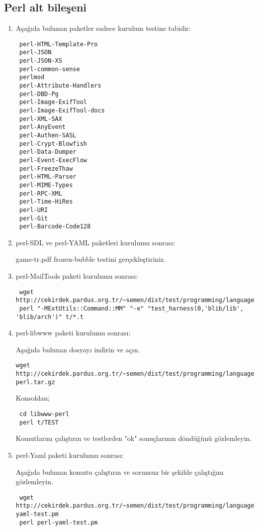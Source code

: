 \documentclass[a4paper,10pt]{article}
\begin{document}
\subsection{Perl alt bileşeni}
\begin{enumerate}
\item Aşağıda bulunan paketler sadece kurulum testine tabidir:
\begin{verbatim}
 perl-HTML-Template-Pro
 perl-JSON
 perl-JSON-XS
 perl-common-sense
 perlmod
 perl-Attribute-Handlers
 perl-DBD-Pg
 perl-Image-ExifTool
 perl-Image-ExifTool-docs
 perl-XML-SAX
 perl-AnyEvent
 perl-Authen-SASL
 perl-Crypt-Blowfish
 perl-Data-Dumper
 perl-Event-ExecFlow
 perl-FreezeThaw
 perl-HTML-Parser
 perl-MIME-Types
 perl-RPC-XML
 perl-Time-HiRes
 perl-URI
 perl-Git
 perl-Barcode-Code128
\end{verbatim}

\item perl-SDL ve perl-YAML paketleri kurulumu sonrası:

game-tr.pdf frozen-bubble testini gerçekleştiriniz.

\item perl-MailTools paketi kurulumu sonrası:
\begin{verbatim}
 wget http://cekirdek.pardus.org.tr/~semen/dist/test/programming/language/perl/MailTools.tar.gz
 perl "-MExtUtils::Command::MM" "-e" "test_harness(0,'blib/lib', 'blib/arch')" t/*.t
\end{verbatim}

\item perl-libwww paketi kurulumu sonrası:

Aşağıda bulunan dosyayı indirin ve açın.
\begin{verbatim}
wget http://cekirdek.pardus.org.tr/~semen/dist/test/programming/language/perl/libwww-perl.tar.gz
\end{verbatim}

Konsoldan;
\begin{verbatim}
 cd libwww-perl
 perl t/TEST
\end{verbatim}

Komutlarını çalıştırın ve testlerden "ok" sonuçlarının döndüğünü gözlemleyin.

\item perl-Yaml paketi kurulumu sonrası:

Aşağıda bulunan komutu çalıştırın ve sorunsuz bir şekilde çalıştığını gözlemleyin.
\begin{verbatim}
 wget http://cekirdek.pardus.org.tr/~semen/dist/test/programming/language/perl/perl-yaml-test.pm
 perl perl-yaml-test.pm
\end{verbatim}


\end{enumerate}
\end{document}
